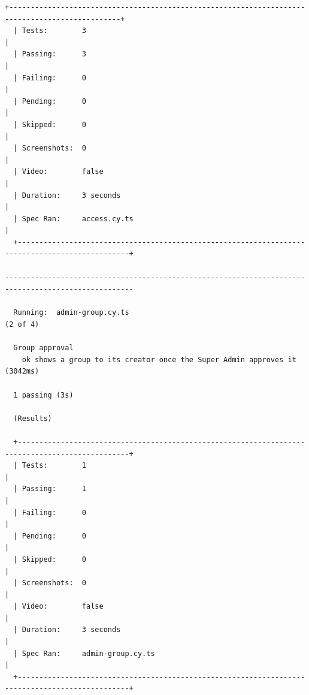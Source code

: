 \documentclass[10pt,a4paper]{article}
\begin{document}
\begin{Verbatim}[fontsize=\scriptsize,breaklines,frame=single]
  +------------------------------------------------------------------------------------------------+
  | Tests:        3                                                                                |
  | Passing:      3                                                                                |
  | Failing:      0                                                                                |
  | Pending:      0                                                                                |
  | Skipped:      0                                                                                |
  | Screenshots:  0                                                                                |
  | Video:        false                                                                            |
  | Duration:     3 seconds                                                                        |
  | Spec Ran:     access.cy.ts                                                                     |
  +------------------------------------------------------------------------------------------------+

----------------------------------------------------------------------------------------------------

  Running:  admin-group.cy.ts                                                               (2 of 4)

  Group approval
    ok shows a group to its creator once the Super Admin approves it (3042ms)

  1 passing (3s)

  (Results)

  +------------------------------------------------------------------------------------------------+
  | Tests:        1                                                                                |
  | Passing:      1                                                                                |
  | Failing:      0                                                                                |
  | Pending:      0                                                                                |
  | Skipped:      0                                                                                |
  | Screenshots:  0                                                                                |
  | Video:        false                                                                            |
  | Duration:     3 seconds                                                                        |
  | Spec Ran:     admin-group.cy.ts                                                                |
  +------------------------------------------------------------------------------------------------+


\end{Verbatim}
\end{document}
